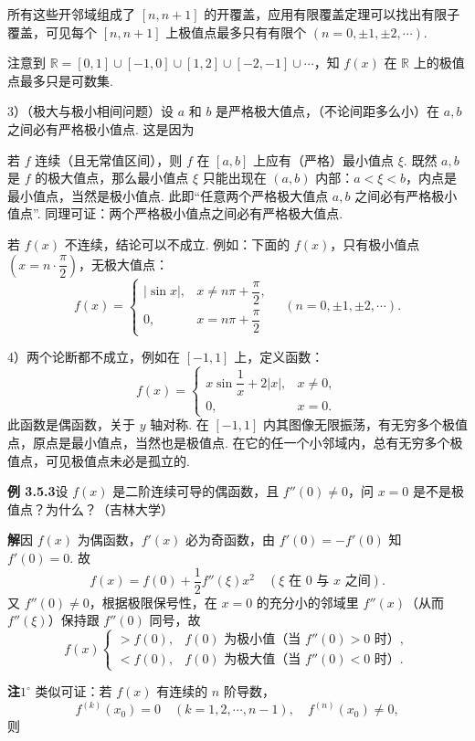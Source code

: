 \documentclass[UTF8,12pt,a4paper,fontset=fandol]{ctexart}
\begin{document}
所有这些开邻域组成了 $[n,n+1]$ 的开覆盖，应用有限覆盖定理可以找出有限子覆盖，可见每个 $[n,n+1]$ 上极值点最多只有有限个 $(n=0,\pm1,\pm2,\cdots)$.

注意到 $\mathbb R=[0,1]\cup[-1,0]\cup[1,2]\cup[-2,-1]\cup\cdots$，知 $f(x)$ 在 $\mathbb R$ 上的极值点最多只是可数集.

3）（极大与极小相间问题）设 $a$ 和 $b$ 是严格极大值点，（不论间距多么小）在 $a,b$ 之间必有严格极小值点. 这是因为

若 $f$ 连续（且无常值区间），则 $f$ 在 $[a,b]$ 上应有（严格）最小值点 $\xi$. 既然 $a,b$ 是 $f$ 的极大值点，那么最小值点 $\xi$ 只能出现在 $(a,b)$ 内部：$a<\xi<b$，内点是最小值点，当然是极小值点. 此即“任意两个严格极大值点 $a,b$ 之间必有严格极小值点”. 同理可证：两个严格极小值点之间必有严格极大值点.

若 $f(x)$ 不连续，结论可以不成立. 例如：下面的 $f(x)$，只有极小值点 $\left(x=n\cdot\dfrac\pi2\right)$，无极大值点：
\[
  f(x)=
  \begin{cases}
  |\sin x|, & x\ne n\pi+\dfrac\pi2,\\
  0, & x=n\pi+\dfrac\pi2
  \end{cases}
  \quad(n=0,\pm1,\pm2,\cdots).
\]

4）两个论断都不成立，例如在 $[-1,1]$ 上，定义函数：
\[
  f(x)=
  \begin{cases}
  x\sin\dfrac1x+2|x|, & x\ne0,\\
  0, & x=0.
  \end{cases} \tag{1}
\]
此函数是偶函数，关于 $y$ 轴对称. 在 $[-1,1]$ 内其图像无限振荡，有无穷多个极值点，原点是最小值点，当然也是极值点. 在它的任一个小邻域内，总有无穷多个极值点，可见极值点未必是孤立的.

\noindent\textbf{例 3.5.3}\quad 设 $f(x)$ 是二阶连续可导的偶函数，且 $f''(0)\ne0$，问 $x=0$ 是不是极值点？为什么？（吉林大学）

\noindent\textbf{解}\quad 因 $f(x)$ 为偶函数，$f'(x)$ 必为奇函数，由 $f'(0)=-f'(0)$ 知 $f'(0)=0$. 故
\[
  f(x)=f(0)+\frac12f''(\xi)x^2\quad(\xi\text{ 在 }0\text{ 与 }x\text{ 之间}). \tag{1}
\]
又 $f''(0)\ne0$，根据极限保号性，在 $x=0$ 的充分小的邻域里 $f''(x)$（从而 $f''(\xi)$）保持跟 $f''(0)$ 同号，故
\[
  f(x)
  \begin{cases}
  >f(0), & f(0)\text{ 为极小值（当 }f''(0)>0\text{ 时）},\\
  <f(0), & f(0)\text{ 为极大值（当 }f''(0)<0\text{ 时）}.
  \end{cases}
\]

\noindent\textbf{注}\quad $1^\circ$ 类似可证：若 $f(x)$ 有连续的 $n$ 阶导数，
\[
  f^{(k)}(x_0)=0\quad(k=1,2,\cdots,n-1),\quad f^{(n)}(x_0)\ne0,
\]
则
\end{document}
